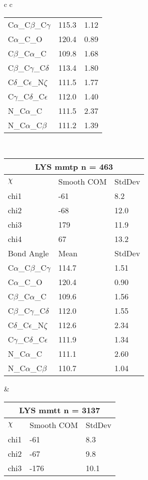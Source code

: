 \begin{longtable}{ c c }
\begin{tabular}{ l l l }
  C$\alpha$\_C$\beta$\_C$\gamma$ & 115.3 & 1.12\\
  C$\alpha$\_C\_O & 120.4 & 0.89\\
  C$\beta$\_C$\alpha$\_C & 109.8 & 1.68\\
  C$\beta$\_C$\gamma$\_C$\delta$ & 113.4 & 1.80\\
  C$\delta$\_C$\epsilon$\_N$\zeta$ & 111.5 & 1.77\\
  C$\gamma$\_C$\delta$\_C$\epsilon$ & 112.0 & 1.40\\
  N\_C$\alpha$\_C & 111.5 & 2.37\\
  N\_C$\alpha$\_C$\beta$ & 111.2 & 1.39\\
  \bottomrule
  \end{tabular}
  \\
  \begin{tabular}{ l l l }
  \toprule
  \multicolumn{3}{c}{LYS \textbf{mmtp} n = 463} \\ \toprule
  $\chi$       & Smooth COM & StdDev \\ \midrule
  chi1 & -61 & 8.2 \\ 
  chi2 & -68 & 12.0 \\ 
  chi3 & 179 & 11.9 \\ 
  chi4 & 67 & 13.2 \\ \midrule
  Bond Angle   & Mean     & StdDev \\ \midrule
  C$\alpha$\_C$\beta$\_C$\gamma$ & 114.7 & 1.51\\
  C$\alpha$\_C\_O & 120.4 & 0.90\\
  C$\beta$\_C$\alpha$\_C & 109.6 & 1.56\\
  C$\beta$\_C$\gamma$\_C$\delta$ & 112.0 & 1.55\\
  C$\delta$\_C$\epsilon$\_N$\zeta$ & 112.6 & 2.34\\
  C$\gamma$\_C$\delta$\_C$\epsilon$ & 111.9 & 1.34\\
  N\_C$\alpha$\_C & 111.1 & 2.60\\
  N\_C$\alpha$\_C$\beta$ & 110.7 & 1.04\\
  \bottomrule
  \end{tabular}
  &
  \begin{tabular}{ l l l }
  \toprule
  \multicolumn{3}{c}{LYS \textbf{mmtt} n = 3137} \\ \toprule
  $\chi$       & Smooth COM & StdDev \\ \midrule
  chi1 & -61 & 8.3 \\ 
  chi2 & -67 & 9.8 \\ 
  chi3 & -176 & 10.1 \\ 

\end{tabular}
\end{longtable}
